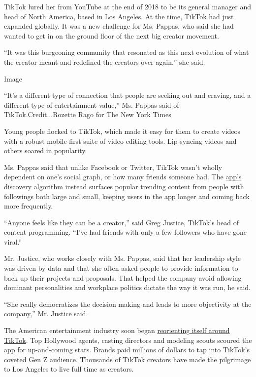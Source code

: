 TikTok lured her from YouTube at the end of 2018 to be its general
manager and head of North America, based in Los Angeles. At the time,
TikTok had just expanded globally. It was a new challenge for Ms.
Pappas, who said she had wanted to get in on the ground floor of the
next big creator movement.

``It was this burgeoning community that resonated as this next evolution
of what the creator meant and redefined the creators over again,'' she
said.

Image

``It's a different type of connection that people are seeking out and
craving, and a different type of entertainment value,'' Ms. Pappas said
of TikTok.Credit...Rozette Rago for The New York Times

Young people flocked to TikTok, which made it easy for them to create
videos with a robust mobile-first suite of video editing tools.
Lip-syncing videos and others soared in popularity.

Ms. Pappas said that unlike Facebook or Twitter, TikTok wasn't wholly
dependent on one's social graph, or how many friends someone had. The
\href{https://www.nytimes3xbfgragh.onion/2020/08/05/technology/tiktok-deal-algorithm.html}{app's
discovery algorithm} instead surfaces popular trending content from
people with followings both large and small, keeping users in the app
longer and coming back more frequently.

``Anyone feels like they can be a creator,'' said Greg Justice, TikTok's
head of content programming. ``I've had friends with only a few
followers who have gone viral.''

Mr. Justice, who works closely with Ms. Pappas, said that her leadership
style was driven by data and that she often asked people to provide
information to back up their projects and proposals. That helped the
company avoid allowing dominant personalities and workplace politics
dictate the way it was run, he said.

``She really democratizes the decision making and leads to more
objectivity at the company,'' Mr. Justice said.

The American entertainment industry soon began
\href{https://www.nytimes3xbfgragh.onion/2020/04/06/style/hollywood-agents-influencers.html}{reorienting
itself around TikTok}. Top Hollywood agents, casting directors and
modeling scouts scoured the app for up-and-coming stars. Brands paid
millions of dollars to tap into TikTok's coveted Gen Z audience.
Thousands of TikTok creators have made the pilgrimage to Los Angeles to
live full time as creators.

